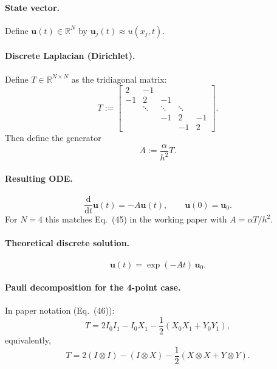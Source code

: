 \documentclass[11pt]{article}
\newcommand{\dd}{\mathrm{d}}
\newcommand{\RR}{\mathbb{R}}
\begin{document}
\paragraph{State vector.}
Define $\mathbf u(t)\in\RR^N$ by $\mathbf u_j(t)\approx u(x_j,t)$.

\paragraph{Discrete Laplacian (Dirichlet).}
Define \(T\in\RR^{N\times N}\) as the tridiagonal matrix:
\begin{equation}
T := \begin{bmatrix}
2 & -1 \\
-1 & 2 & -1 \\
& \ddots & \ddots & \ddots \\
&& -1 & 2 & -1 \\
&&& -1 & 2
\end{bmatrix}.
\end{equation}
Then define the generator
\begin{equation}
A := \frac{\alpha}{h^2} T.
\end{equation}

\paragraph{Resulting ODE.}
\begin{equation}
\frac{\dd}{\dd t}\mathbf u(t) = -A\mathbf u(t),\qquad \mathbf u(0)=\mathbf u_0.
\end{equation}
For \(N=4\) this matches Eq.~(45) in the working paper with \(A=\alpha T/h^2\).

\paragraph{Theoretical discrete solution.}
\begin{equation}
\mathbf u(t)=\exp(-At)\,\mathbf u_0.
\end{equation}
\paragraph{Pauli decomposition for the 4-point case.}
In paper notation (Eq.~(46)):
\begin{equation}
T=2I_0I_1-I_0X_1-\frac12(X_0X_1+Y_0Y_1),
\end{equation}
equivalently,
\begin{equation}
T=2(I\otimes I)-(I\otimes X)-\frac12(X\otimes X+Y\otimes Y).
\end{equation}
\end{document}
